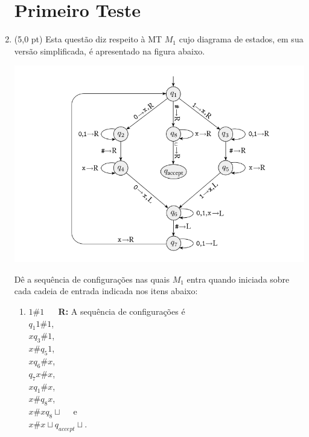 \documentclass[12pt,a4paper,oneside]{article}
\begin{document}
\begin{enumerate}
	
	\section*{Primeiro Teste}
	
	\item (5,0 pt) Esta questão diz respeito à MT $M_1$ cujo diagrama de estados, em sua versão simplificada, é apresentado na figura abaixo.	
	\begin{center}
		\includegraphics[width=\textwidth]{images/diagrama.png}
	\end{center}	
	 Dê a sequência de configurações nas quais $M_1$ entra quando iniciada sobre cada cadeia de entrada indicada nos itens abaixo:
	 
	 	\newpage
	 
	\begin{enumerate}
		\item $1\#1$ \ \ {\color{blue} {\bf R:} 
			A sequência de configurações é \\
			$q_1 1 \# 1$, \\
			$x q_3 \# 1$, \\
			$x \# q_5 1$, \\
			$x q_6 \# x$, \\
			$q_7 x \# x$, \\
			$x q_1 \# x$, \\
			$x \# q_8 x$, \\
			$x \# x q_8 \sqcup$ \ \ e \\
			$x \# x \sqcup q_{accept} \sqcup$.
		}
		

\end{enumerate}
\end{enumerate}
\end{document}
